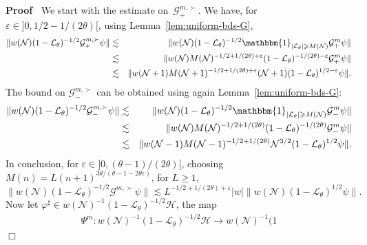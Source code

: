 \documentclass[10pt]{article}
\newenvironment{proof}{\noindent\textbf{Proof\ }}{\hspace*{\fill}$\Box$\medskip}
\begin{document}
\begin{proof}
  We start with the estimate on~$\mathcal{G}_+^{m, \succ}$. We have, for
  $\varepsilon \in] 0, 1 / 2 - 1 / (2 \theta) [$, using
  Lemma~\ref{lem:uniform-bds-G},
  \begin{eqnarray*}
    \| w (\mathcal{N}) (1 -\mathcal{L}_{\theta})^{- 1 / 2} \mathcal{G}_+^{m,
    \succ} \psi \| & \lesssim & \| w (\mathcal{N}) (1
    -\mathcal{L}_{\theta})^{- 1 / 2} \mathbbm{1}_{| \mathcal{L}_{\theta} |
    \geqslant M (\mathcal{N})}^{} \mathcal{G}_+^m \psi \|\\
    & \lesssim & \| w (\mathcal{N}) M (\mathcal{N})^{- 1 / 2 + 1 / (2 \theta)
    + \varepsilon} (1 -\mathcal{L}_{\theta})^{- 1 / (2 \theta) - \varepsilon}
    \mathcal{G}_+^m \psi \|\\
    & \lesssim & \| w (\mathcal{N}+ 1) M (\mathcal{N}+ 1)^{- 1 / 2 + 1 / (2
    \theta) + \varepsilon} (\mathcal{N}+ 1) (1 -\mathcal{L}_{\theta})^{1 / 2 -
    \varepsilon} \psi \| .
  \end{eqnarray*}
  The bound on $\mathcal{G}_-^{m, \succ}$ can be obtained using again
  Lemma~\ref{lem:uniform-bds-G}:
  \begin{eqnarray*}
    \| w (\mathcal{N}) (1 -\mathcal{L}_{\theta})^{- 1 / 2} \mathcal{G}_-^{m,
    \succ} \psi \| & \lesssim & \| w (\mathcal{N}) (1
    -\mathcal{L}_{\theta})^{- 1 / 2} \mathbbm{1}_{| \mathcal{L}_{\theta} |
    \geqslant M (\mathcal{N})}^{} \mathcal{G}_-^m \psi \|\\
    & \lesssim & \| w (\mathcal{N}) M (\mathcal{N})^{- 1 / 2 + 1 / (2
    \theta)} (1 -\mathcal{L}_{\theta})^{- 1 / (2 \theta)} \mathcal{G}_-^m \psi
    \|\\
    & \lesssim & \| w (\mathcal{N}- 1) M (\mathcal{N}- 1)^{- 1 / 2 + 1 / (2
    \theta)} \mathcal{N}^{3 / 2} (1 -\mathcal{L}_{\theta})^{1 / 2} \psi \| .
  \end{eqnarray*}
  In conclusion, for $\varepsilon \in] 0, (\theta - 1) / (2 \theta) [$,
  choosing $M (n) = L (n + 1)^{3 \theta / (\theta - 1 - 2 \theta
  \varepsilon)}$, for $L \geqslant 1$,
  \[ \| w (\mathcal{N}) (1 -\mathcal{L}_{\theta})^{- 1 / 2} \mathcal{G}^{m,
     \succ} \psi \| \lesssim L^{- 1 / 2 + 1 / (2 \theta) + \varepsilon} | w |
     \| w (\mathcal{N}) (1 -\mathcal{L}_{\theta})^{1 / 2} \psi \| . \]
  Now let $\varphi^{\sharp} \in w (\mathcal{N})^{- 1} (1
  -\mathcal{L}_{\theta})^{- 1 / 2} \mathcal{H}$, the map
  \[ \begin{array}{c}
       \Psi^m : w (\mathcal{N})^{- 1} (1 -\mathcal{L}_{\theta})^{- 1 / 2}
       \mathcal{H} \rightarrow w (\mathcal{N})^{- 1} (1

\end{array}\]
\end{proof}
\end{document}
